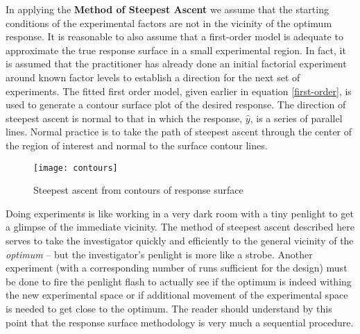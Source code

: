 In applying the \textbf{Method of Steepest Ascent} we assume that the starting conditions of the experimental factors are not in the vicinity of the optimum response.  It is reasonable to also assume that a first-order model is adequate to approximate the true response surface in a small experimental region. In fact, it is assumed that the practitioner has already done an initial factorial experiment around known factor levels to establish a direction for the next set of experiments. The fitted first order model, given earlier in equation \ref{first-order}, is used to generate a contour surface plot of the desired response.  The direction of steepest ascent is normal to that in which the response, $\hat{y}$, is a series of parallel lines. Normal practice is to take the path of steepest ascent through the center of the region of interest and normal to the surface contour lines.

\begin{figure}[h]\caption{Steepest ascent from contours of response surface}\label{contours}
\begin{center}
\texttt{[image: contours]}
\end{center}
\end{figure}

Doing experiments is like working in a very dark room with a tiny penlight to get a glimpse of the immediate vicinity.\label{penlight}  The method of steepest ascent described here serves to take the investigator quickly and efficiently to the general vicinity of the \textit{optimum} -- but the investigator's penlight is more like a strobe.  Another experiment (with a corresponding number of runs sufficient for the design) must be done to fire the penlight flash to actually see if the optimum is indeed withing the new experimental space or if additional movement of the experimental space is needed to get close to the optimum. The reader should understand by this point that the response surface methodology is very much a sequential procedure.



